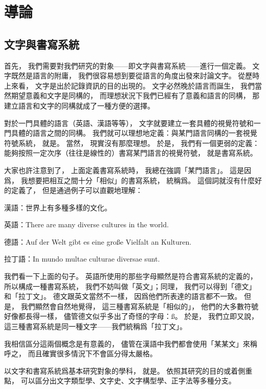 \chapter{導論}
\section{文字與書寫系統}
首先，
我們需要對我們研究的對象——即文字與書寫系統——進行一個定義。
文字既然是語言的附庸，
我們很容易想到要從語言的角度出發來討論文字。
從歷時上來看，
文字是出於記錄資訊的目的出現的。
文字必然晚於語言而誕生，
我們當然期望意義和文字是同構的，
而理想狀況下我們已經有了意義和語言的同構，
那建立語言和文字的同構就成了一種方便的選擇。

對於一門具體的語言（英語、漢語等等），
文字就要建立一套具體的視覺符號和一門具體的語言之間的同構。
我們就可以理想地定義：與某門語言同構的一套視覺符號系統，
就是。
當然，
現實沒有那麼理想。
於是，
我們有一個更弱的定義：能夠按照一定次序（往往是線性的）書寫某門語言的視覺符號，
就是書寫系統。

大家也許注意到了，
上面定義書寫系統時，
我總在強調「某門語言」。
這是因爲，
我想要把相互之間十分「相似」的書寫系統，
統稱爲。
這個詞就沒有什麼好的定義了，
但是通過例子可以直觀地理解：

\begin{ExampleBlock}
漢語：世界上有多種多樣的文化。

英語：There are many diverse cultures in the world.

德語：Auf der Welt gibt es eine große Vielfalt an Kulturen.

拉丁語：In mundo multae culturae diversae sunt.
\end{ExampleBlock}

我們看一下上面的句子。
英語所使用的那些字母顯然是符合書寫系統的定義的，
所以構成一種書寫系統，
我們不妨叫做「英文」；同理，
我們可以得到「德文」和「拉丁文」。
德文跟英文當然不一樣，
因爲他們所表達的語言都不一致。
但是，
我們顯然會自然地覺得，
這三種書寫系統是「相似的」，
他們的大多數符號好像都長得一樣，
儘管德文似乎多出了奇怪的字母：ß。
於是，
我們立即又說，
這三種書寫系統是同一種文字——我們統稱爲「拉丁文」。

我相信區分這兩個概念是有意義的，
儘管在漢語中我們都會使用「某某文」來稱呼之，
而且確實很多情況下不會區分得太嚴格。

以文字和書寫系統爲基本研究對象的學科，
就是。
依照其研究的目的或着側重點，
可以區分出文字類型學、文字史、文字構型學、正字法等多種分支。

